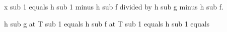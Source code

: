 x sub 1 equals h sub 1 minus h sub f divided by h sub g minus h sub f.  

h sub g at T sub 1 equals  
h sub f at T sub 1 equals  
h sub 1 equals